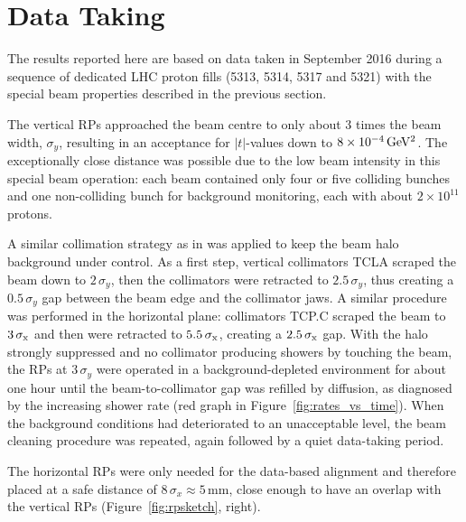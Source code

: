 \section{Data Taking}
\label{sec:data taking}

The results reported here are based on data taken in September 2016 during a sequence of dedicated LHC proton fills (5313, 5314, 5317 and 5321) with the special beam properties described in the previous section.

The vertical RPs approached the beam centre to only about 3 times the beam width, $\sigma_{y}$, resulting in an acceptance for $|t|$-values down to $8 \times 10^{-4}\,\rm GeV^{2}$. The exceptionally close distance was possible due to the low beam intensity in this special beam operation: each beam contained only four or five colliding bunches and one non-colliding bunch for background monitoring, each with about $2\times 10^{11}$ protons.

A similar collimation strategy as in \cite{totem-1km} was applied to keep the beam halo background under control. As a first step, vertical collimators TCLA scraped the beam down to $2\,\sigma_{y}$, then the collimators were retracted to $2.5\,\sigma_{y}$, thus creating a $0.5\,\sigma_{y}$ gap between the beam edge and the collimator jaws. A similar procedure was performed in the horizontal plane: collimators TCP.C scraped the beam to $3\,{\rm \sigma_{x}}$ and then were retracted to $5.5\,{\rm \sigma_{x}}$, creating a $2.5\,{\rm \sigma_x}$ gap. With the halo strongly suppressed and no collimator producing showers by touching the beam, the RPs at $3\,\sigma_{y}$ were operated in a background-depleted environment for about one hour until the beam-to-collimator gap was refilled by diffusion, as diagnosed by the increasing shower rate (red graph in Figure~\ref{fig:rates_vs_time}). When the background conditions had deteriorated to an unacceptable level, the beam cleaning procedure was repeated, again followed by a quiet data-taking period.




The horizontal RPs were only needed for the data-based alignment and therefore placed at a safe distance of $8\,\sigma_{x} \approx 5$\,mm, close enough to have an overlap with the vertical RPs (Figure~\ref{fig:rpsketch}, right).


